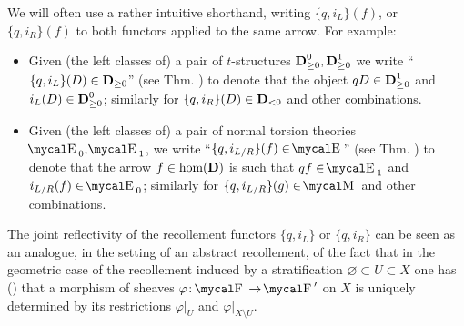 \begin{notat}\label{veryshort}
We will often use a rather intuitive shorthand, writing $\{q, i_L\}(f)$, or $\{q, i_R\}(f)$ to both functors applied to the same arrow. For example:
\begin{itemize}
	\item Given (the left classes of) a pair of $t$\hyp{}structures $\textbf{D}_{\ge 0}^0, \textbf{D}_{\ge 0}^1$ we write ``$\{q, i_L\}(D)\in \textbf{D}_{\ge 0}$'' (see Thm. ) to denote that the object $qD\in \textbf{D}_{\ge 0}^1$ and $i_L(D)\in \textbf{D}_{\ge 0}^0$; similarly for $\{q, i_R\}(D)\in \textbf{D}_{< 0}$ and other combinations.
	\item Given (the left classes of) a pair of normal torsion theories $\EE_0, \EE_1$, we write ``$\{q, i_{L/R}\}(f)\in \EE$'' (see Thm. ) to denote that the arrow $f\in\text{hom}(\textbf{D})$ is such that $qf\in \EE_1$ and $i_{L/R}(f)\in \EE_0$; similarly for $\{q, i_{L/R}\}(g)\in \MM$ and other combinations.
\end{itemize}
\end{notat}
\begin{remark}
The joint reflectivity of the recollement functors $\{q, i_L\}$ or $\{q, i_R\}$ can be seen as an analogue, in the setting of an abstract recollement, of the fact that in the geometric case of the recollement induced by a stratification $\varnothing\subset U\subset X$ one has (\cite[\textbf{2.3}]{parshall1988derived}) that a morphism of sheaves $\varphi\colon \F\to \F'$ on $X$ is uniquely determined by its restrictions $\varphi\bigr\vert_{U}$ and $\varphi\bigr\vert_{X\setminus U}$.
\end{remark}

